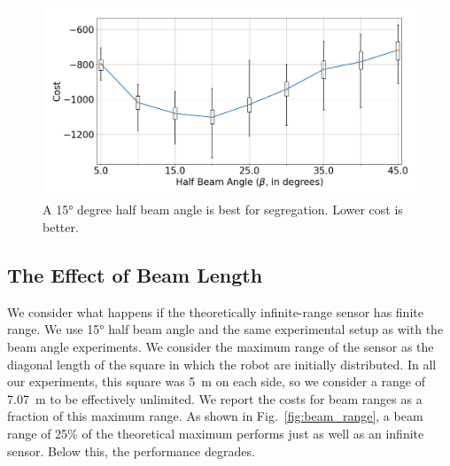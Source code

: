 \documentclass[letterpaper, 10 pt, conference]{ieeeconf}
\begin{document}
  \begin{figure}[t]
    \centering
    \includegraphics[width=1\linewidth]{./images/beam_angle.png}
    \caption{A \ang{15} degree half beam angle is best for segregation. Lower cost is better.}
    \label{fig:beam_angle}
  \end{figure}

  \subsection{The Effect of Beam Length} \label{section:beam_range}

  We consider what happens if the theoretically infinite-range sensor has finite
  range. We use \ang{15} half beam angle and the same experimental setup as with
  the beam angle experiments. We consider the maximum range of the sensor as the
  diagonal length of the square in which the robot are initially distributed. In
  all our experiments, this square was \SI{5}{\meter} on each side, so we consider
  a range of \SI{7.07}{\meter} to be effectively unlimited. We report the costs
  for beam ranges as a fraction of this maximum range. As shown in
  Fig.~\ref{fig:beam_range}, a beam range of 25\% of the theoretical maximum
  performs just as well as an infinite sensor. Below this, the performance
  degrades.
\end{document}

